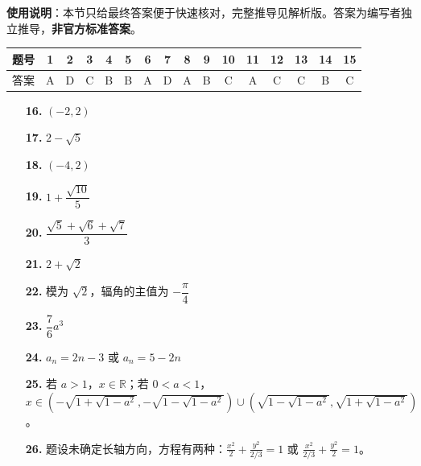 
\begin{gknotice}
\textbf{使用说明}：本节只给最终答案便于快速核对，完整推导见解析版。答案为编写者独立推导，\textbf{非官方标准答案}。
\end{gknotice}

\begin{center}\begin{tabular}{cccccccccccccccc}
\toprule
题号 & 1 & 2 & 3 & 4 & 5 & 6 & 7 & 8 & 9 & 10 & 11 & 12 & 13 & 14 & 15 \\
\midrule
答案 & A & D & C & B & B & A & D & A & B & C & A & C & C & B & C \\
\bottomrule
\end{tabular}\end{center}

\begin{itemize}[leftmargin=2.6em]
  \item[\textbf{16.}] $(-2,2)$
  \item[\textbf{17.}] $2-\sqrt5$
  \item[\textbf{18.}] $(-4,2)$
  \item[\textbf{19.}] $1+\dfrac{\sqrt{10}}5$
  \item[\textbf{20.}] $\dfrac{\sqrt5+\sqrt6+\sqrt7}{3}$
  \item[\textbf{21.}] $2+\sqrt2$
\end{itemize}

\begin{itemize}[leftmargin=2.6em]
  \item[\textbf{22.}] 模为 $\sqrt2$，辐角的主值为 $-\dfrac\pi4$
  \item[\textbf{23.}] $\dfrac76a^3$
  \item[\textbf{24.}] $a_n=2n-3$ 或 $a_n=5-2n$
  \item[\textbf{25.}] 若 $a>1$，$x\in\mathbb R$；若 $0<a<1$，$x\in\left(-\sqrt{1+\sqrt{1-a^2}},-\sqrt{1-\sqrt{1-a^2}}\right)\cup\left(\sqrt{1-\sqrt{1-a^2}},\sqrt{1+\sqrt{1-a^2}}\right)$。
  \item[\textbf{26.}] 题设未确定长轴方向，方程有两种：$\frac{x^2}{2}+\frac{y^2}{2/3}=1$ 或 $\frac{x^2}{2/3}+\frac{y^2}{2}=1$。
\end{itemize}

